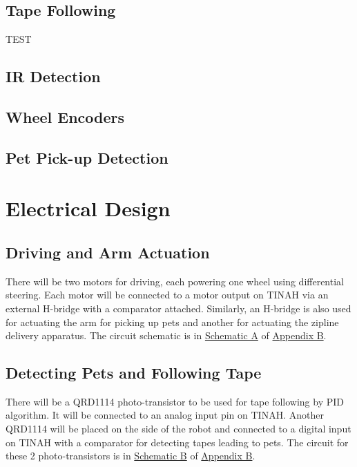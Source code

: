 \documentclass[11pt, oneside]{article} %
\begin{document}
	\subsection{Tape Following}
	
	TEST
	
	\subsection{IR Detection}
	
	\subsection{Wheel Encoders}
	
	\subsection{Pet Pick-up Detection}
	

\section{Electrical Design}

	\subsection{Driving and Arm Actuation}
	
	There will be two motors for driving, each powering one wheel using differential steering. Each motor will be connected to a motor output on TINAH via an external H-bridge with a comparator attached. Similarly, an H-bridge is also used for actuating the arm for picking up pets and another for actuating the zipline delivery apparatus. The circuit schematic is in \hyperref[sch:A]{Schematic A} of \hyperref[appendixB]{Appendix B}.
	
	\subsection{Detecting Pets and Following Tape}
	
	There will be a QRD1114 photo-transistor to be used for tape following by PID algorithm. It will be connected to an analog input pin on TINAH. Another QRD1114 will be placed on the side of the robot and connected to a digital input on TINAH with a comparator for detecting tapes leading to pets. The circuit for these 2 photo-transistors is in \hyperref[sch:B]{Schematic B} of \hyperref[appendixB]{Appendix B}. 
	
\end{document}
